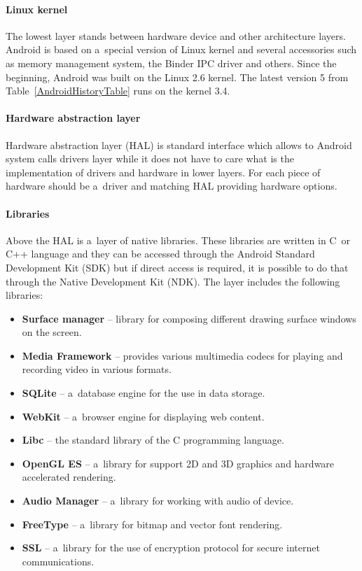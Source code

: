 \paragraph{Linux kernel}
The lowest layer stands between hardware device and other architecture layers. Android is based on a~special version of
Linux kernel and several accessories such as memory management system, the Binder IPC driver and others. Since the
beginning, Android was built on the Linux 2.6 kernel. The latest version 5 from Table~\ref{AndroidHistoryTable} runs on
the kernel 3.4.

\paragraph{Hardware abstraction layer}
Hardware abstraction layer (HAL) is standard interface which allows to Android system calls drivers layer while it does
not have to care what is the implementation of drivers and hardware in lower layers. For each piece of hardware should
be a~driver and matching HAL providing hardware options.

\paragraph{Libraries}
Above the HAL is a~layer of native libraries. These libraries are written in C~or C++ language and they can be accessed
through the Android Standard Development Kit (SDK) but if direct access is required, it is possible to do that through
the Native Development Kit (NDK). The layer includes the following libraries:

\begin{itemize}
    \item \textbf{Surface manager} -- library for composing different drawing surface windows on the screen.
    \item \textbf{Media Framework} -- provides various multimedia codecs for playing and recording video in various
    formats.
    \item \textbf{SQLite} -- a~database engine for the use in data storage.
    \item \textbf{WebKit} -- a~browser engine for displaying web content.
    \item \textbf{Libc} -- the standard library of the C programming language.
    \item \textbf{OpenGL ES} -- a~library for support 2D and 3D graphics and hardware accelerated rendering.
    \item \textbf{Audio Manager} -- a~library for working with audio of device.
    \item \textbf{FreeType} -- a~library for bitmap and vector font rendering.
    \item \textbf{SSL} -- a~library for the use of encryption protocol for secure internet communications.
\end{itemize}

